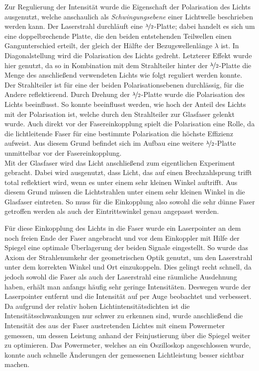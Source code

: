  Zur Regulierung der Intensität wurde die Eigenschaft der Polarisation des Lichts ausgenutzt, welche anschaulich als \textit{Schwingungsebene} einer Lichtwelle beschrieben werden kann. Der Laserstrahl durchläuft eine $\nicefrac{\lambda}{2}$-Platte; dabei handelt es sich um eine doppelbrechende Platte, die den beiden entstehenden Teilwellen einen Gangunterschied erteilt, der gleich der Hälfte der Bezugswellenlänge $\lambda$ ist. In Diagonalstellung wird die Polarisation des Lichts gedreht. Letzterer Effekt wurde hier genutzt, da so in Kombination mit dem Strahlteiler hinter der $\nicefrac{\lambda}{2}$-Platte die Menge des anschließend verwendeten Lichts wie folgt reguliert werden konnte. Der Strahlteiler ist für eine der beiden Polarisationsebenen durchlässig, für die Andere reflektierend. Durch Drehung der $\nicefrac{\lambda}{2}$-Platte wurde die Polarisation des Lichts beeinflusst. So konnte beeinflusst werden, wie hoch der Anteil des Lichts mit der Polarisation ist, welche durch den Strahlteiler zur Glasfaser gelenkt wurde. Auch direkt vor der Fasereinkopplung spielt die Polarisation eine Rolle, da die lichtleitende Faser für eine bestimmte Polarisation die höchste Effizienz aufweist. Aus diesem Grund befindet sich im Aufbau eine weitere $\nicefrac{\lambda}{2}$-Platte unmittelbar vor der Fasereinkopplung.\\

Mit der Glasfaser wird das Licht anschließend zum eigentlichen Experiment gebracht. Dabei wird ausgenutzt, dass Licht, das auf einen Brechzahlsprung trifft total reflektiert wird, wenn es unter einem sehr kleinen Winkel auftrifft. Aus diesem Grund müssen die Lichtstrahlen unter einem sehr kleinen Winkel in die Glasfaser eintreten. So muss für die Einkopplung also sowohl die sehr dünne Faser getroffen werden als auch der Eintrittswinkel genau angepasst werden.

Für diese Einkopplung des Lichts in die Faser wurde ein Laserpointer an dem noch freien Ende der Faser angebracht und vor dem Einkoppler mit Hilfe der Spiegel eine optimale Überlagerung der beiden Signale eingestellt. So wurde das Axiom der Strahlenumkehr der geometrischen Optik genutzt, um den Laserstrahl unter dem korrekten Winkel und Ort einzukoppeln. Dies gelingt recht schnell, da jedoch sowohl die Faser als auch der Laserstrahl eine räumliche Ausdehnung haben, erhält man anfangs häufig sehr geringe Intensitäten. Deswegen wurde der Laserpointer entfernt und die Intensität auf per Auge beobachtet und verbessert. Da aufgrund der relativ hohen Lichtintensitätsdichten ist die Intensitätsschwankungen  nur schwer zu erkennen sind, wurde anschließend die Intensität des aus der Faser austretenden Lichtes mit einem Powermeter gemessen, um dessen Leistung anhand der Feinjustierung über die Spiegel weiter zu optimieren. Das Powermeter, welches an ein Oszilloskop angeschlossen wurde, konnte auch schnelle Änderungen der gemessenen Lichtleistung besser sichtbar machen.

